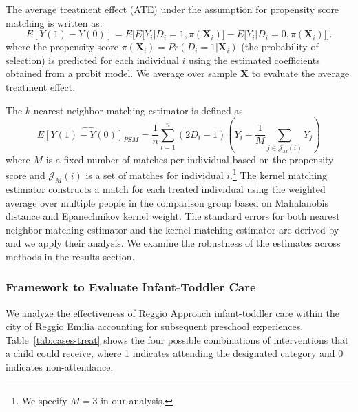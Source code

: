 The average treatment effect (ATE) under the assumption for propensity score matching is written as:
\begin{equation} \label{eq:ATE-PSM}
E[Y(1)-Y(0)] = E\bigg[E\big[Y_i|D_i=1, \pi(\boldsymbol{X}_i)\big] - E\big[Y_i|D_i=0, \pi(\boldsymbol{X}_i)\big]\bigg].
\end{equation}
where the propensity score $\pi(\boldsymbol{X}_i) = Pr(D_i=1|\boldsymbol{X}_i)$ (the probability of selection) is predicted for each individual $i$ using the estimated coefficients obtained from a probit model. We average over sample $\bm{X}$ to evaluate the average treatment effect.

The $k$-nearest neighbor matching estimator is defined as
\begin{equation} \label{eq:PSM-estimator}
\widehat{E[Y(1)-Y(0)]_{PSM}} = \frac{1}{n} \sum_{i=1}^{n} (2D_i -1)(Y_i - \frac{1}{M}\sum_{j \in \mathcal{J}_M(i)}Y_j )
\end{equation}
where $M$ is a fixed number of matches per individual based on the propensity score and $\mathcal{J}_M(i)$ is a set of matches for individual $i$.\footnote{We specify $M = 3$ in our analysis.} The kernel matching estimator constructs a match for each treated individual using the weighted average over multiple people in the comparison group based on Mahalanobis distance and Epanechnikov kernel weight. The standard errors for both nearest neighbor matching estimator and the kernel matching estimator are derived by \cite{Abadie_Imbens_2006_Econometrica} and we apply their analysis. We examine the robustness of the estimates across methods in the results section.

\subsubsection{Framework to Evaluate Infant-Toddler Care}
\label{subsubsection:itc}

We analyze the effectiveness of Reggio Approach infant-toddler care within the city of Reggio Emilia accounting for subsequent preschool experiences. Table~\ref{tab:cases-treat} shows the four possible combinations of interventions that a child could receive, where 1 indicates attending the designated category and 0 indicates non-attendance.

